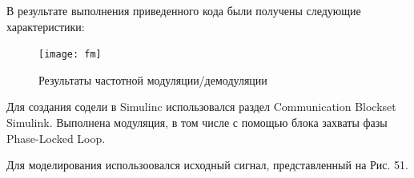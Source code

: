\documentclass[10pt,a4paper]{article}
\begin{document}
В результате выполнения приведенного кода были получены следующие характеристики:

\begin{figure}[h]\centering
	\texttt{[image: fm]}
	\caption{Результаты частотной модуляции/демодуляции}\label{fig.fm}
\end{figure}                                                                                                                                                                                                                                                                                                                                                                                                                                                                                                                                                                                                                                                                                                                                                                                                                                                                                                                                                                                                                                                                                                                                                                                                                                                                                                                                                                                                                                                                        
\FloatBarrier

Для создания содели в Simulinc использовался раздел Communication Blockset Simulink. Выполнена модуляция, в том числе с помощью блока захваты фазы Phase-Locked Loop.

Для моделирования использоовался исходный сигнал, представленный на Рис. 51.
\end{document}

